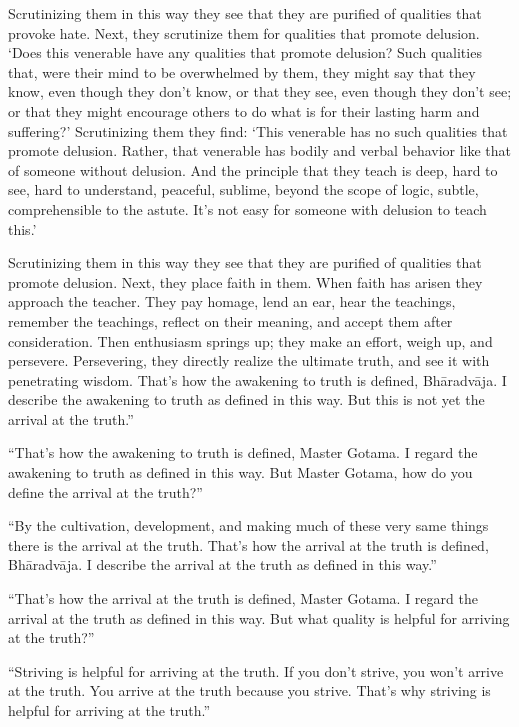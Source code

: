 \documentclass[12pt,openany]{book}%
\begin{document}
Scrutinizing them in this way they see that they are purified of qualities that provoke hate. Next, they scrutinize them for qualities that promote delusion. ‘Does this venerable have any qualities that promote delusion? Such qualities that, were their mind to be overwhelmed by them, they might say that they know, even though they don’t know, or that they see, even though they don’t see; or that they might encourage others to do what is for their lasting harm and suffering?’ Scrutinizing them they find: ‘This venerable has no such qualities that promote delusion. Rather, that venerable has bodily and verbal behavior like that of someone without delusion. And the principle that they teach is deep, hard to see, hard to understand, peaceful, sublime, beyond the scope of logic, subtle, comprehensible to the astute. It’s not easy for someone with delusion to teach this.’ 

Scrutinizing them in this way they see that they are purified of qualities that promote delusion. Next, they place faith in them. When faith has arisen they approach the teacher. They pay homage, lend an ear, hear the teachings, remember the teachings, reflect on their meaning, and accept them after consideration. Then enthusiasm springs up; they make an effort, weigh up, and persevere. Persevering, they directly realize the ultimate truth, and see it with penetrating wisdom. That’s how the awakening to truth is defined, \textsanskrit{Bhāradvāja}. I describe the awakening to truth as defined in this way. But this is not yet the arrival at the truth.” 

“That’s how the awakening to truth is defined, Master Gotama. I regard the awakening to truth as defined in this way. But Master Gotama, how do you define the arrival at the truth?” 

“By the cultivation, development, and making much of these very same things there is the arrival at the truth. That’s how the arrival at the truth is defined, \textsanskrit{Bhāradvāja}. I describe the arrival at the truth as defined in this way.” 

“That’s how the arrival at the truth is defined, Master Gotama. I regard the arrival at the truth as defined in this way. But what quality is helpful for arriving at the truth?” 

“Striving is helpful for arriving at the truth. If you don’t strive, you won’t arrive at the truth. You arrive at the truth because you strive. That’s why striving is helpful for arriving at the truth.” 
\end{document}
